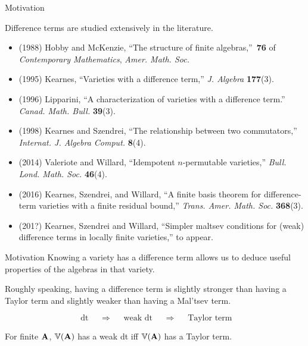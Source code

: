 \documentclass[notes=hide,12pt,xcolor=dvipsnames%
   ]{beamer}
\begin{document}
\begin{frame}[label=motivation-lit]{Motivation}

  Difference terms are studied extensively in the literature.

\begin{itemize}


\item
  {\footnotesize (1988)
    Hobby and McKenzie, ``The structure of finite algebras,''~{\bf 76} of
    {\em Contemporary Mathematics}, {\em Amer. Math. Soc.} }
\item
  {\footnotesize (1995) 
    Kearnes, ``Varieties with a difference term,'' 
    {\em J. Algebra} {\bf 177}(3).}
\item
  {\footnotesize (1996)
    Lipparini, ``A characterization of varieties with a difference term.''
    {\em Canad. Math. Bull.} {\bf 39}(3).}
\item
  {\footnotesize (1998)
    Kearnes and Szendrei, ``The relationship between two commutators,''
    {\em Internat. J. Algebra Comput.} {\bf 8}(4). } 
\item
  {\footnotesize (2014)
    Valeriote and Willard, ``Idempotent {$n$}-permutable varieties,'' 
    {\em Bull. Lond. Math. Soc.} {\bf 46}(4).}
\item
  {\footnotesize (2016)
    Kearnes, Szendrei, and Willard, ``A finite basis theorem for
    difference-term varieties with a finite residual bound,'' 
    {\em Trans. Amer. Math. Soc.} {\bf 368}(3).}
\item
  {\footnotesize (201?)
  Kearnes, Szendrei and Willard, ``Simpler maltsev conditions for (weak)
  difference terms in locally finite varieties,'' to appear.}
\end{itemize}
\end{frame}


\begin{frame}[label=motivation-heuristics]{Motivation}
  Knowing a variety has a difference term allows us to deduce useful
  properties of the algebras in that variety.

  Roughly speaking, having a difference term is slightly stronger than having
  a Taylor term and slightly weaker than having a Mal'tsev term.

  \[
  \text{ dt } \quad \Rightarrow \quad \text{ weak dt } \quad \Rightarrow \quad \text{ Taylor term}\]
  
  For finite $\mathbf{A}$, $\operatorname{\mathbb{V}}(\mathbf{A})$ has a weak dt iff
  $\operatorname{\mathbb{V}}(\mathbf{A})$ has a Taylor term.
\end{frame}
\end{document}
